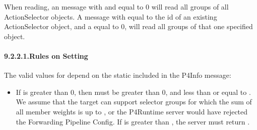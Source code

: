\documentclass[11pt]{article}
\begin{document}
{%
When reading, an  message with  and
 equal to 0 will read all groups of all ActionSelector objects.  A
message with  equal to the id of an existing ActionSelector
object, and a  equal to 0, will read all groups of that one specified
object.%

\paragraph{9.2.2.1.\hspace*{0.5em}Rules on Setting }\label{sec-max-size-rules}%

\noindent{}The valid values for  depend on the static  included
in the P4Info message:%

\begin{itemize}%

\item{}
If  is greater than 0, then  must be greater than 0,
and less than or equal to . We assume that the target can
support selector groups for which the sum of all member weights is up to
, or the P4Runtime server would have rejected the Forwarding
Pipeline Config. If  is greater than , the server
must return .%


\end{itemize}}
\end{document}
